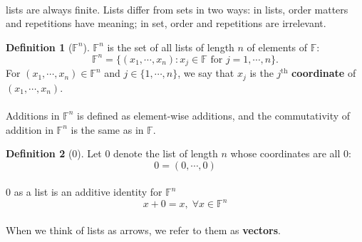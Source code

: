 \documentclass[paper=a4, fontsize=11pt]{scrartcl}
\numberwithin{equation}{section}		%
\numberwithin{figure}{section}			%
\numberwithin{table}{section}				%
\renewcommand{\th}{\ensuremath{\operatorname{th}}}
\theoremstyle{definition}
\newtheorem{definition}{Definition}[section]
\theoremstyle{remark}
\theoremstyle{example}
\begin{document}
\paragraph{}

lists are always finite. Lists differ from sets in two ways: in lists, order matters and repetitions have meaning; in set, order and repetitions are irrelevant.

\begin{definition}[$\mathbb{F}^n$]
    $\mathbb{F}^n$ is the set of all lists of length $n$ of elements of $\mathbb{F}$:
    \begin{equation}
        \mathbb{F}^n = \{(x_1,\cdots,x_n):x_j\in \mathbb{F} \text{ for } j = 1, \cdots, n\}.
    \end{equation}
    For $(x_1, \cdots, x_n) \in \mathbb{F}^n$ and $j \in \{1, \cdots, n\}$, we say that $x_j$ is the $j^{\th}$ \textbf{coordinate} of $(x_1, \cdots, x_n)$.
\end{definition}

\paragraph{}

Additions in $\mathbb{F}^n$ is defined as element-wise additions, and the commutativity of addition in $\mathbb{F}^n$ is the same as in $\mathbb{F}$.

\begin{definition}[$0$]
    Let $0$ denote the list of length $n$ whose coordinates are all $0$:
    \begin{equation}
        0 = (0, \cdots, 0)
    \end{equation}
\end{definition}

\paragraph{}

$0$ as a list is an additive identity for $\mathbb{F}^n$
\begin{equation}
    x + 0 = x,\; \forall x \in \mathbb{F}^n
\end{equation}

\paragraph{}

When we think of lists as arrows, we refer to them as \textbf{vectors}.
\end{document}
